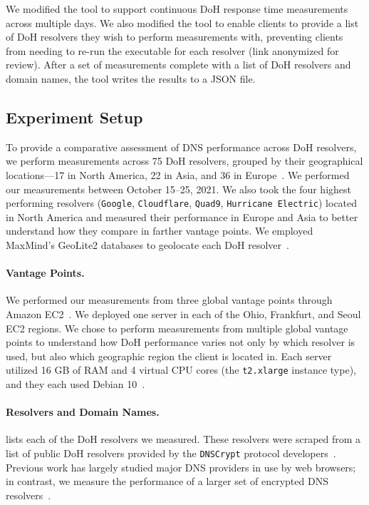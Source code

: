 We modified the tool to support continuous DoH response time measurements
across multiple days.  We also modified the tool to enable clients to provide
a list of DoH resolvers they wish to perform measurements with, preventing
clients from needing to re-run the executable for each resolver (link
anonymized for review).  After a set of measurements complete with a list of
DoH resolvers and domain names, the tool writes the results to a JSON file.

\subsection{Experiment Setup} To provide a comparative assessment of DNS
performance across DoH resolvers, we perform measurements across 75 DoH
resolvers, grouped by their geographical locations—17 in North America, 22 in
Asia, and 36 in Europe~\cite{dnscrypt}.  We performed our measurements between
October 15--25, 2021.  We also took the four highest
performing resolvers (\texttt{Google}, \texttt{Cloudflare}, \texttt{Quad9},
\texttt{Hurricane Electric}) located in North America and measured their
performance in Europe and Asia to better understand how they compare in
farther vantage points.  We employed MaxMind's GeoLite2 databases to geolocate
each DoH resolver~\cite{maxmind}.

\paragraph{Vantage Points.} We performed our measurements from three global
vantage points through Amazon EC2~\cite{amazon_ec2}.  We deployed one server
in each of the Ohio, Frankfurt, and Seoul EC2 regions.  We chose to perform
measurements from multiple global vantage points to understand how DoH
performance varies not only by which resolver is used, but also which
geographic region the client is located in.  Each server utilized 16 GB of RAM
and 4 virtual CPU cores (the \texttt{t2.xlarge} instance type), and they each
used Debian 10~\cite{amazon_ec2_instance_types}.

\paragraph{Resolvers and Domain Names.}  lists each of 
the DoH resolvers we measured.  These resolvers were
scraped from a list of public DoH resolvers provided by the \texttt{DNSCrypt}
protocol developers~\cite{dnscrypt-public-resolvers}.  Previous work has
largely studied major DNS providers in use by web browsers; in contrast, we
measure the performance of a larger set of encrypted DNS resolvers~\cite{hounsel2020comparing,hounsel2021can,hoang2020k,lu2019end-to-end}.

